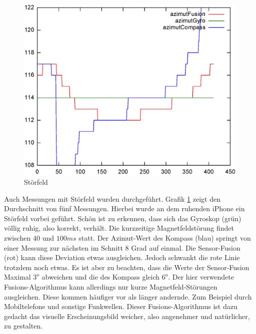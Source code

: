 \begin{figure}[htb]
\centering
\includegraphics[width=\textwidth]{figures/heading007}
\caption{Störfeld}
\label{fig:heading007}
\end{figure}
Auch Messungen mit Störfeld wurden durchgeführt. Grafik \ref{fig:heading007} zeigt den Durchschnitt von fünf Messungen. Hierbei wurde an dem ruhenden iPhone ein Störfeld vorbei geführt. Schön ist zu erkennen, dass sich das Gyroskop (grün) völlig ruhig, also korrekt, verhält. Die kurzzeitige Magnetfeldstörung findet zwischen $40$ und $100ms$ statt. Der Azimut-Wert des Kompass (blau) springt von einer Messung zur nächsten im Schnitt 8 Grad auf einmal. Die Sensor-Fusion (rot) kann diese Deviation etwas ausgleichen. Jedoch schwankt die rote Linie trotzdem noch etwas. Es ist aber zu beachten, dass die Werte der Sensor-Fusion Maximal $3^o$ abweichen und die des Kompass gleich $6^o$. %
Der hier verwendete Fusions-Algorithmus kann allerdings nur kurze Magnetfeld-Störungen ausgleichen. Diese kommen häufiger vor als länger andernde. Zum Beispiel durch Mobiltelefone und sonstige Funkwellen. Dieser Fusions-Algorithmus ist dazu gedacht das visuelle Erscheinungsbild weicher, also angenehmer und natürlicher, zu gestalten.

